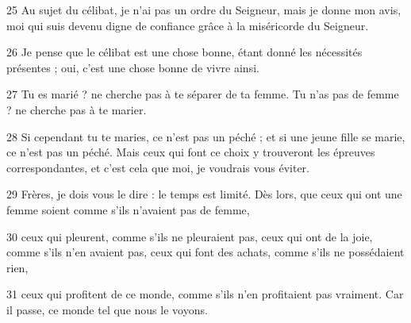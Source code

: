 25 Au sujet du célibat, je n’ai pas un ordre du Seigneur, mais je donne mon avis, moi qui suis devenu digne de confiance grâce à la miséricorde du Seigneur.

26 Je pense que le célibat est une chose bonne, étant donné les nécessités présentes ; oui, c’est une chose bonne de vivre ainsi.

27 Tu es marié ? ne cherche pas à te séparer de ta femme. Tu n’as pas de femme ? ne cherche pas à te marier.

28 Si cependant tu te maries, ce n’est pas un péché ; et si une jeune fille se marie, ce n’est pas un péché. Mais ceux qui font ce choix y trouveront les épreuves correspondantes, et c’est cela que moi, je voudrais vous éviter.

29 Frères, je dois vous le dire : le temps est limité. Dès lors, que ceux qui ont une femme soient comme s’ils n’avaient pas de femme,

30 ceux qui pleurent, comme s’ils ne pleuraient pas, ceux qui ont de la joie, comme s’ils n’en avaient pas, ceux qui font des achats, comme s’ils ne possédaient rien,

31 ceux qui profitent de ce monde, comme s’ils n’en profitaient pas vraiment. Car il passe, ce monde tel que nous le voyons.
